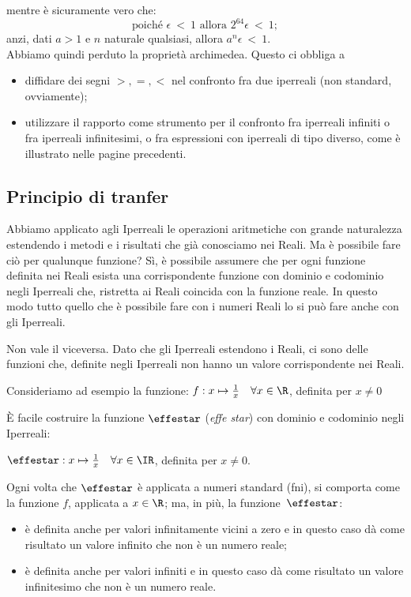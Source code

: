 mentre è sicuramente vero che:
\[
 \text{poiché }\epsilon \  < \ 1 \text{  allora  } 2^{64}\epsilon\ <\ 1;
\]
anzi, dati $a>1$ e $n$ naturale qualsiasi, allora \(a^{n}\epsilon\ <\ 1\).\\

Abbiamo quindi perduto la proprietà archimedea. Questo ci obbliga a 
\begin{itemize} [noitemsep]
 \item 
diffidare dei segni \(>,=,<\) nel confronto fra due iperreali (non standard, ovviamente);
 \item 
utilizzare il rapporto come strumento per il confronto fra iperreali infiniti o fra
iperreali infinitesimi, o fra espressioni con iperreali di tipo diverso, come è
illustrato nelle pagine precedenti. 
\end{itemize}

\subsection{Principio di tranfer}
\label{subsec:insnum_nonarchimedei}

Abbiamo applicato agli Iperreali le operazioni aritmetiche con grande 
naturalezza estendendo i metodi e i risultati che già conosciamo nei Reali. 
Ma è possibile fare ciò per qualunque funzione? 
Sì, è possibile assumere che per ogni funzione definita nei Reali esista una 
corrispondente funzione con dominio e codominio negli Iperreali che, ristretta 
ai Reali coincida con la funzione reale.
In questo modo tutto quello che è possibile fare con i numeri Reali lo si può 
fare anche con gli Iperreali.

\begin{osservazione}
 Non vale il viceversa. Dato che gli Iperreali estendono i Reali, ci sono delle 
funzioni che, definite negli Iperreali non hanno un valore corrispondente nei 
Reali.

\begin{esempio}
 Consideriamo ad esempio la funzione: 
$f: x \mapsto \frac{1}{x} \quad \forall x \in \R$, definita per $x\ne 0$

È facile costruire la funzione $\effestar$ (\emph{effe star}) con dominio e codominio 
negli Iperreali:

$\effestar: x \mapsto \frac{1}{x} \quad \forall x \in \IR$, definita per $x\ne 0$.

Ogni volta che $\effestar$ è applicata a numeri standard (fni), si comporta come
la funzione $f$, applicata a $x \in \R$; ma, in più, la funzione~$\effestar$:
\begin{itemize} [noitemsep]
 \item 
è definita anche per valori infinitamente vicini a zero e 
in questo caso dà come risultato un valore infinito che non è un numero reale;
 \item 
è definita anche per valori infiniti e
in questo caso dà come risultato un valore infinitesimo che non è un numero 
reale. 
\end{itemize}
\end{esempio}
\end{osservazione}

